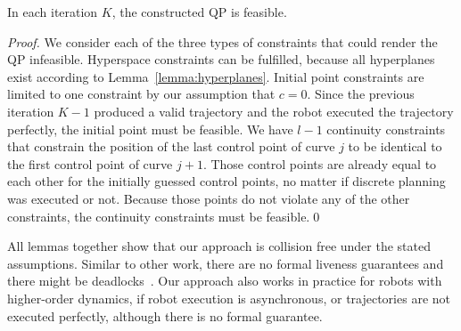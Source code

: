 \documentclass{svproc}
\newcommand{\vp}{\mathbf{p}}
\begin{document}
\begin{lemma}
In each iteration $K$, the constructed QP is feasible.
\end{lemma}
\begin{proof}
We consider each of the three types of constraints that could render the QP infeasible.
Hyperspace constraints can be fulfilled, because all hyperplanes exist according to Lemma~\ref{lemma:hyperplanes}.
Initial point constraints are limited to one constraint by our assumption that $c=0$.
Since the previous iteration $K-1$ produced a valid trajectory and the robot executed the trajectory perfectly, the initial point must be feasible.
We have $l-1$ continuity constraints that constrain the position of the last control point of curve $j$ to be identical to the first control point of curve $j+1$.
Those control points are already equal to each other for the initially guessed control points, no matter if discrete planning was executed or not.
Because those points do not violate any of the other constraints, the continuity constraints must be feasible.\qed
\end{proof}

All lemmas together show that our approach is collision free under the stated assumptions.
Similar to other work, there are no formal liveness guarantees and there might be deadlocks~\cite{bufferedVoronoiCells}.
Our approach also works in practice for robots with higher-order dynamics, if robot execution is asynchronous, or trajectories are not executed perfectly, although there is no formal guarantee.



\end{document}
